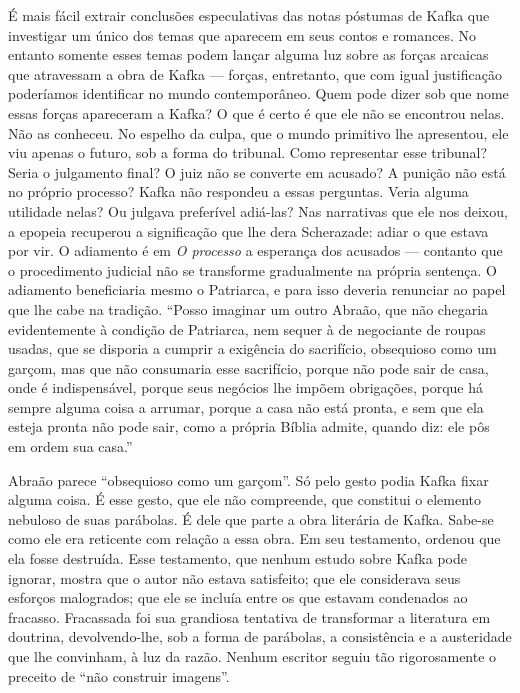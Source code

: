 É mais fácil extrair conclusões especulativas das notas póstumas de
Kafka que investigar um único dos temas que aparecem em seus contos e
romances. No entanto somente esses temas podem lançar alguma luz sobre
as forças arcaicas que atravessam a obra de Kafka --- forças,
entretanto, que com igual justificação poderíamos identificar no mundo
contemporâneo. Quem pode dizer sob que nome essas forças apareceram a
Kafka? O que é certo é que ele não se encontrou nelas. Não as conheceu.
No espelho da culpa, que o mundo primitivo lhe apresentou, ele viu
apenas o futuro, sob a forma do tribunal. Como representar esse
tribunal? Seria o julgamento final? O juiz não se converte em acusado? A
punição não está no próprio processo? Kafka não respondeu a essas
perguntas. Veria alguma utilidade nelas? Ou julgava preferível adiá-las?
Nas narrativas que ele nos deixou, a epopeia recuperou a significação
que lhe dera Scherazade: adiar o que estava por vir. O adiamento é em \textit{O
processo} a esperança dos acusados --- contanto que o procedimento
judicial não se transforme gradualmente na própria sentença. O adiamento
beneficiaria mesmo o Patriarca, e para isso deveria renunciar ao papel
que lhe cabe na tradição. ``Posso imaginar um outro Abraão, que não
chegaria evidentemente à condição de Patriarca, nem sequer à de
negociante de roupas usadas, que se disporia a cumprir a exigência do
sacrifício, obsequioso como um garçom, mas que não consumaria esse
sacrifício, porque não pode sair de casa, onde é indispensável, porque
seus negócios lhe impõem obrigações, porque há sempre alguma coisa a
arrumar, porque a casa não está pronta, e sem que ela esteja pronta não
pode sair, como a própria Bíblia admite, quando diz: ele pôs em ordem
sua casa.''

Abraão parece ``obsequioso como um garçom''. Só pelo gesto podia Kafka
fixar alguma coisa. É esse gesto, que ele não compreende, que constitui
o elemento nebuloso de suas parábolas. É dele que parte a obra literária
de Kafka. Sabe-se como ele era reticente com relação a essa obra. Em seu
testamento, ordenou que ela fosse destruída. Esse testamento, que nenhum
estudo sobre Kafka pode ignorar, mostra que o autor não estava
satisfeito; que ele considerava seus esforços malogrados; que ele se
incluía entre os que estavam condenados ao fracasso. Fracassada foi sua
grandiosa tentativa de transformar a literatura em doutrina,
devolvendo-lhe, sob a forma de parábolas, a consistência e a austeridade
que lhe convinham, à luz da razão. Nenhum escritor seguiu tão
rigorosamente o preceito de ``não construir imagens''.

